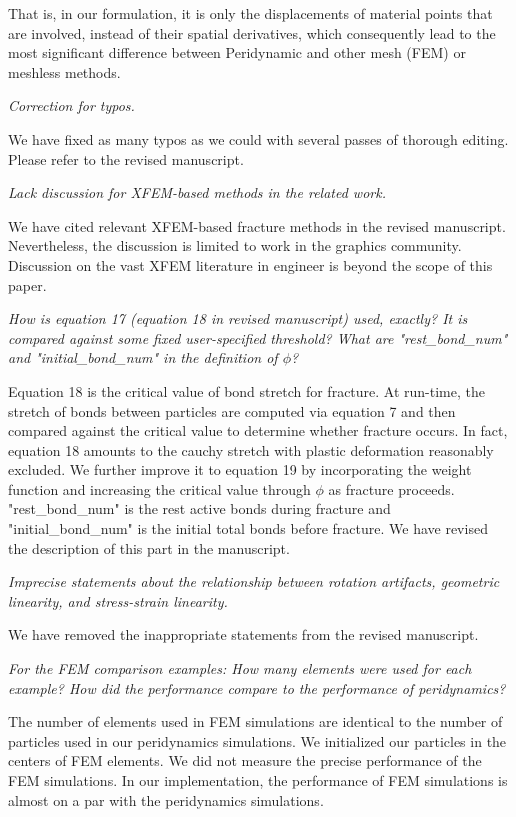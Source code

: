 That is, in our formulation, it is only the displacements of material points that are involved,
instead of their spatial derivatives, which consequently lead to the most significant difference between Peridynamic and other mesh (FEM) or meshless methods.

\emph{Correction for typos.}

We have fixed as many typos as we could with several passes of thorough editing. Please refer to the revised manuscript.

\emph{Lack discussion for XFEM-based methods in the related work.}

We have cited relevant XFEM-based fracture methods in the revised manuscript. Nevertheless, the discussion is limited to work in the graphics community. Discussion on the vast XFEM literature in engineer is beyond the scope of this paper.

\emph{How is equation 17 (equation 18 in revised manuscript) used, exactly? It is compared against some fixed user-specified threshold? What are "rest\_bond\_num" and "initial\_bond\_num" in the definition of $\phi$?}

Equation 18 is the critical value of bond stretch for fracture. At run-time, the stretch of bonds between particles are computed via equation 7 and then compared against the critical value to determine whether fracture occurs.
 In fact, equation 18 amounts to the cauchy stretch with plastic deformation reasonably excluded. We further improve it to equation 19 by incorporating the weight function and increasing the critical value through $\phi$ as fracture proceeds. "rest\_bond\_num" is the rest active bonds during fracture and "initial\_bond\_num" is the initial total bonds before fracture. We have revised the description of this part in the manuscript.

\emph{Imprecise statements about the relationship between rotation artifacts, geometric linearity, and stress-strain linearity.}

We have removed the inappropriate statements from the revised manuscript.

\emph{For the FEM comparison examples: How many elements were used for each example? How did the performance compare to the performance of peridynamics?}

The number of elements used in FEM simulations are identical to the number of particles used in our peridynamics simulations. We initialized our particles in the centers of FEM elements. We did not measure the precise performance of the FEM simulations. In our implementation, the performance of FEM simulations is almost on a par with the peridynamics simulations.

